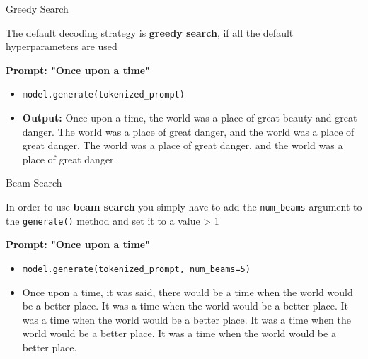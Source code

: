 
\begin{vbframe}{Greedy Search}

\vfill

The default decoding strategy is \textbf{greedy search}, if all the default hyperparameters are used

\textbf{Prompt: "Once upon a time"}

\begin{itemize}
    \item \texttt{model.generate(tokenized\_prompt)}
    \item \textbf{Output:} Once upon a time, the world was a place of great beauty and great danger. The world was a place of great danger, and the world was a place of great danger. The world was a place of great danger, and the world was a place of great danger.
\end{itemize}

\vfill
    
\end{vbframe}


\begin{vbframe}{Beam Search}

\vfill

In order to use \textbf{beam search} you simply have to add the \texttt{num\_beams} argument to the \texttt{generate()} method and set it to a value > 1

\textbf{Prompt: "Once upon a time"}

\begin{itemize}
    \item \texttt{model.generate(tokenized\_prompt, num\_beams=5)}
    \item Once upon a time, it was said, there would be a time when the world would be a better place.
    It was a time when the world would be a better place.
    It was a time when the world would be a better place.
    It was a time when the world would be a better place.
    It was a time when the world would be a better place.
\end{itemize}

\vfill
    
\end{vbframe}



